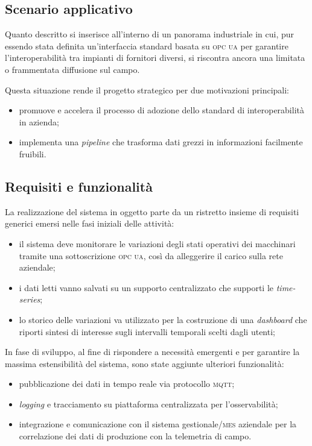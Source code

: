 \documentclass[12pt]{article}
\begin{document}
    \subsection{Scenario applicativo}
    
    Quanto descritto si inserisce all'interno di un panorama industriale in cui, pur essendo stata definita un’interfaccia standard basata su \textsc{opc ua} per garantire l’interoperabilità tra impianti di fornitori diversi, si riscontra ancora una limitata o frammentata diffusione sul campo.
    
    Questa situazione rende il progetto strategico per due motivazioni principali:
    \begin{itemize}
        \item promuove e accelera il processo di adozione dello standard di interoperabilità in azienda;
        \item implementa una \textit{pipeline} che trasforma dati grezzi in informazioni facilmente fruibili.
    \end{itemize}
    
    \subsection{Requisiti e funzionalità}
    
    La realizzazione del sistema in oggetto parte da un ristretto insieme di requisiti generici emersi nelle fasi iniziali delle attività:
    \begin{itemize}
        \item il sistema deve monitorare le variazioni degli stati operativi dei macchinari tramite una sottoscrizione \textsc{opc ua}, così da alleggerire il carico sulla rete aziendale;
        \item i dati letti vanno salvati su un supporto centralizzato che supporti le \textit{time-series};
        \item lo storico delle variazioni va utilizzato per la costruzione di una \textit{dashboard} che riporti sintesi di interesse sugli intervalli temporali scelti dagli utenti;
    \end{itemize}
    
    In fase di sviluppo, al fine di rispondere a necessità emergenti e per garantire la massima estensibilità del sistema, sono state aggiunte ulteriori funzionalità:
    \begin{itemize}
        \item pubblicazione dei dati in tempo reale via protocollo \textsc{mqtt};
        \item \textit{logging} e tracciamento su piattaforma centralizzata per l'osservabilità;
        \item integrazione e comunicazione con il sistema gestionale/\textsc{mes} aziendale per la correlazione dei dati di produzione con la telemetria di campo.
    \end{itemize}
    
\end{document}
